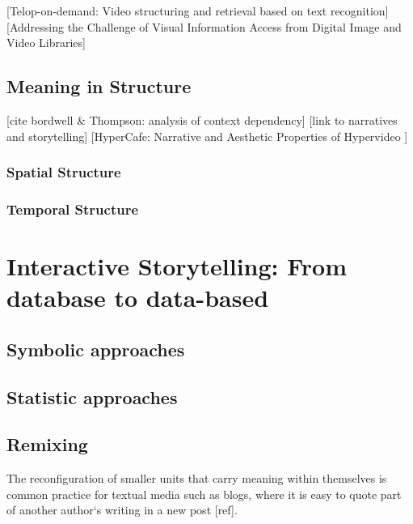[Telop-on-demand: Video structuring and retrieval based on text recognition]\cite{Kuwano:2000wy}
[Addressing the Challenge of Visual Information Access from Digital Image and Video Libraries]\cite{Christel:2005td}

\subsection{Meaning in Structure}


[cite bordwell \& Thompson: analysis of context dependency]
[link to narratives and storytelling]
[HyperCafe: Narrative and Aesthetic Properties of Hypervideo \cite{Sawhney:1996tk}]

\subsubsection{Spatial Structure}
\subsubsection{Temporal Structure}




\section{Interactive Storytelling: From database to data-based}
\label{ch:storytelling}
\subsection{Symbolic approaches}
\label{sec:symbolic}

\cite{Vilmos:2011wv,RodrigoLaiolaGuimaraes:2011tl,Ursu:2009gc}

\subsection{Statistic approaches}
\label{sec:statistic}

\subsection{Remixing}

The reconfiguration of smaller units that carry meaning within themselves is common practice for textual media such as blogs, where it is easy to quote part of  another author`s writing in a new post [ref]. 

